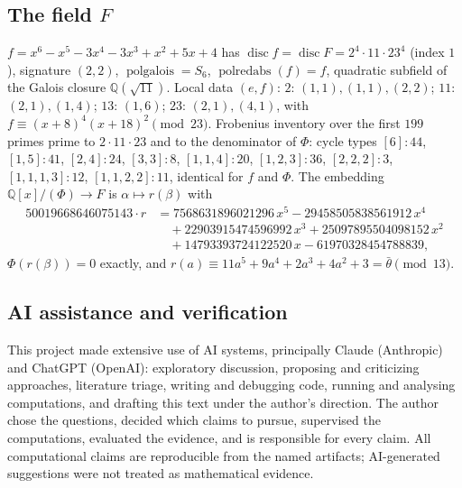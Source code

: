 \documentclass[11pt]{amsart}
\newcommand{\QQ}{\mathbb{Q}}
\newcommand{\disc}{\operatorname{disc}}
\newcommand{\sextic}{x^6-x^5-3x^4-3x^3+x^2+5x+4}
\theoremstyle{plain}
\theoremstyle{definition}
\begin{document}
\subsection*{The field $F$}
$f=\sextic$ has $\disc f=\disc F=2^4\cdot11\cdot23^4$ (index $1$),
signature $(2,2)$, $\operatorname{polgalois}=S_6$,
$\operatorname{polredabs}(f)=f$, quadratic subfield of the Galois
closure $\QQ(\sqrt{11})$. Local data $(e,f)$: $2$: $(1,1),(1,1),(2,2)$;
$11$: $(2,1),(1,4)$; $13$: $(1,6)$; $23$: $(2,1),(4,1)$, with
$f\equiv(x+8)^4(x+18)^2\pmod{23}$. Frobenius inventory over the first
$199$ primes prime to $2\cdot11\cdot23$ and to the denominator of
$\Phi$: cycle types
$[6]\!:44$, $[1,5]\!:41$, $[2,4]\!:24$, $[3,3]\!:8$, $[1,1,4]\!:20$,
$[1,2,3]\!:36$, $[2,2,2]\!:3$, $[1,1,1,3]\!:12$, $[1,1,2,2]\!:11$,
identical for $f$ and $\Phi$. The embedding $\QQ[x]/(\Phi)\to F$ is
$\alpha\mapsto r(\beta)$ with
\begin{align*}
  50019668646075143\cdot r&=7568631896021296\,x^5-29458505838561912\,x^4\\
  &\quad+22903915474596992\,x^3+25097895504098152\,x^2\\
  &\quad+14793393724122520\,x-61970328454788839,
\end{align*}
$\Phi(r(\beta))=0$ exactly, and $r(a)\equiv11a^5+9a^4+2a^3+4a^2+3=\bar\theta
\pmod{13}$.

\subsection*{AI assistance and verification}
This project made extensive use of AI systems, principally Claude
(Anthropic) and ChatGPT (OpenAI): exploratory discussion, proposing
and criticizing approaches, literature triage, writing and debugging
code, running and analysing computations, and drafting this text under
the author's direction. The author chose the questions, decided which
claims to pursue, supervised the computations, evaluated the evidence,
and is responsible for every claim. All computational claims are
reproducible from the named artifacts; AI-generated suggestions were
not treated as mathematical evidence.
\end{document}
